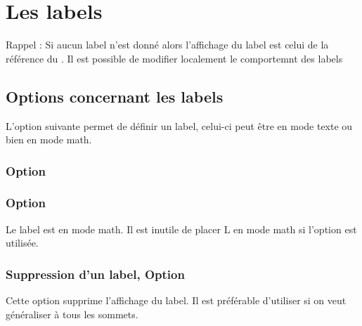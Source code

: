 \section{Les labels}
Rappel : Si aucun label n'est donné alors l'affichage du label est celui de la référence du . Il est possible de modifier localement  le comportemnt des labels

\subsection{Options concernant les labels}

L'option suivante permet de définir un label, celui-ci peut être en mode texte ou bien en mode math. 

\subsubsection{Option } 

\begin{tkzexample}[latex=7cm,small]
\end{tkzexample}

\subsubsection{Option } 
Le label est en mode math. Il est inutile de placer L en mode math si l'option est utilisée.

\begin{tkzexample}[latex=7cm,small]
\end{tkzexample}


\subsubsection{Suppression d'un  label, Option } 
Cette option supprime l'affichage du label. Il est préférable d'utiliser  si on veut généraliser à tous les sommets.   

\begin{tkzexample}[latex=7cm,small]
\end{tkzexample} 

